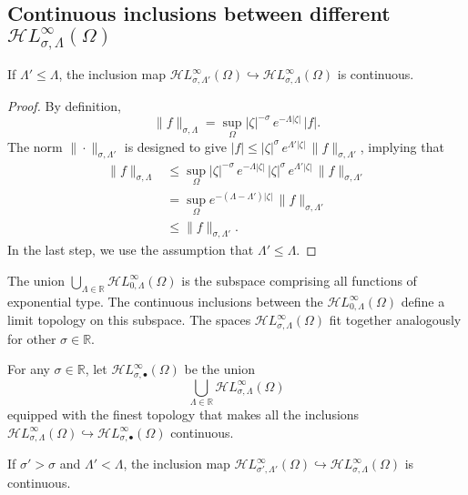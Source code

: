 \documentclass[final]{siamart220329}
\newcommand{\R}{\mathbb{R}}
\newcommand{\singexp}[2]{\mathcal{H}L^\infty_{#1, #2}}
\newcommand{\singexpalg}[1]{\singexp{#1}{\bullet}}
\newcommand{\domain}{\Omega}
\begin{document}
\subsection{Continuous inclusions between different $\singexp{\sigma}{\Lambda}(\Omega)$}\label{sec:inclusions}
\begin{proposition}\label{prop:inclus-ge-exp}
If $\Lambda'\leq\Lambda$, the inclusion map $\singexp{\sigma}{\Lambda'}(\Omega)\hookrightarrow \singexp{\sigma}{\Lambda}(\Omega)$ is continuous.
\end{proposition}
\begin{proof}
By definition,
\[ \|f\|_{\sigma,\Lambda}=\sup_{\Omega} |\zeta|^{-\sigma}\,e^{-\Lambda |\zeta|}\, |f|. \]
The norm $\|\cdot\|_{\sigma, \Lambda'}$ is designed to give $|f| \le |\zeta|^\sigma\,e^{\Lambda'|\zeta|}\,\|f\|_{\sigma, \Lambda'}$, implying that
\begin{align*}
\|f\|_{\sigma,\Lambda} & \leq \sup_{\Omega} |\zeta|^{-\sigma}\,e^{-\Lambda |\zeta|}\,|\zeta|^\sigma\,e^{\Lambda'|\zeta|}\,\|f\|_{\sigma, \Lambda'}\\
&=\sup_{\Omega} e^{-(\Lambda-\Lambda') |\zeta|}\,\|f\|_{\sigma, \Lambda'}\\
&\leq \|f\|_{\sigma,\Lambda'}.
\end{align*}
In the last step, we use the assumption that $\Lambda' \le \Lambda$.
\end{proof}
The union $\bigcup_{\Lambda \in \R} \singexp{0}{\Lambda}(\domain)$ is the subspace comprising all functions of exponential type. The continuous inclusions between the $\singexp{0}{\Lambda}(\domain)$ define a limit topology on this subspace. The spaces $\singexp{\sigma}{\Lambda}(\domain)$ fit together analogously for other $\sigma \in \R$.
\begin{definition}\label{def:exp-top}
For any $\sigma \in \R$, let $\singexpalg{\sigma}(\domain)$ be the union
\[ \bigcup_{\Lambda \in \R} \singexp{\sigma}{\Lambda}(\domain) \]
equipped with the finest topology that makes all the inclusions $\singexp{\sigma}{\Lambda}(\domain) \hookrightarrow \singexpalg{\sigma}(\domain)$ continuous.
\end{definition}
\begin{proposition}\label{prop:inclus-lt-pow-gt-exp}
If $\sigma'>\sigma$ and $\Lambda'<\Lambda$, the inclusion map $\singexp{\sigma'}{\Lambda'}(\Omega)\hookrightarrow \singexp{\sigma}{\Lambda}(\Omega)$ is continuous.
\end{proposition}
\end{document}
